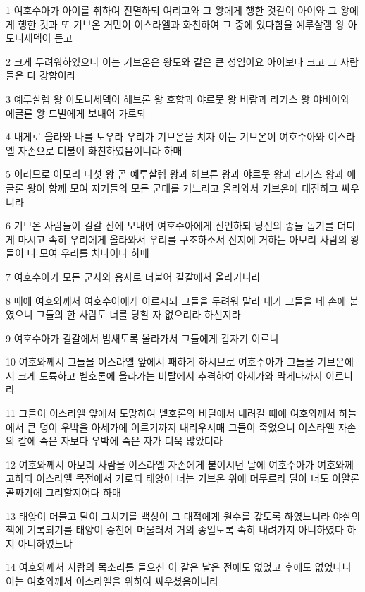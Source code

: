 \par 1 여호수아가 아이를 취하여 진멸하되 여리고와 그 왕에게 행한 것같이 아이와 그 왕에게 행한 것과 또 기브온 거민이 이스라엘과 화친하여 그 중에 있다함을 예루살렘 왕 아도니세덱이 듣고
\par 2 크게 두려워하였으니 이는 기브온은 왕도와 같은 큰 성임이요 아이보다 크고 그 사람들은 다 강함이라
\par 3 예루살렘 왕 아도니세덱이 헤브론 왕 호함과 야르뭇 왕 비람과 라기스 왕 야비아와 에글론 왕 드빌에게 보내어 가로되
\par 4 내게로 올라와 나를 도우라 우리가 기브온을 치자 이는 기브온이 여호수아와 이스라엘 자손으로 더불어 화친하였음이니라 하매
\par 5 이러므로 아모리 다섯 왕 곧 예루살렘 왕과 헤브론 왕과 야르뭇 왕과 라기스 왕과 에글론 왕이 함께 모여 자기들의 모든 군대를 거느리고 올라와서 기브온에 대진하고 싸우니라
\par 6 기브온 사람들이 길갈 진에 보내어 여호수아에게 전언하되 당신의 종들 돕기를 더디게 마시고 속히 우리에게 올라와서 우리를 구조하소서 산지에 거하는 아모리 사람의 왕들이 다 모여 우리를 치나이다 하매
\par 7 여호수아가 모든 군사와 용사로 더불어 길갈에서 올라가니라
\par 8 때에 여호와께서 여호수아에게 이르시되 그들을 두려워 말라 내가 그들을 네 손에 붙였으니 그들의 한 사람도 너를 당할 자 없으리라 하신지라
\par 9 여호수아가 길갈에서 밤새도록 올라가서 그들에게 갑자기 이르니
\par 10 여호와께서 그들을 이스라엘 앞에서 패하게 하시므로 여호수아가 그들을 기브온에서 크게 도륙하고 벧호론에 올라가는 비탈에서 추격하여 아세가와 막게다까지 이르니라
\par 11 그들이 이스라엘 앞에서 도망하여 벧호론의 비탈에서 내려갈 때에 여호와께서 하늘에서 큰 덩이 우박을 아세가에 이르기까지 내리우시매 그들이 죽었으니 이스라엘 자손의 칼에 죽은 자보다 우박에 죽은 자가 더욱 많았더라
\par 12 여호와께서 아모리 사람을 이스라엘 자손에게 붙이시던 날에 여호수아가 여호와께 고하되 이스라엘 목전에서 가로되 태양아 너는 기브온 위에 머무르라 달아 너도 아얄론 골짜기에 그리할지어다 하매
\par 13 태양이 머물고 달이 그치기를 백성이 그 대적에게 원수를 갚도록 하였느니라 야살의 책에 기록되기를 태양이 중천에 머물러서 거의 종일토록 속히 내려가지 아니하였다 하지 아니하였느냐
\par 14 여호와께서 사람의 목소리를 들으신 이 같은 날은 전에도 없었고 후에도 없었나니 이는 여호와께서 이스라엘을 위하여 싸우셨음이니라
